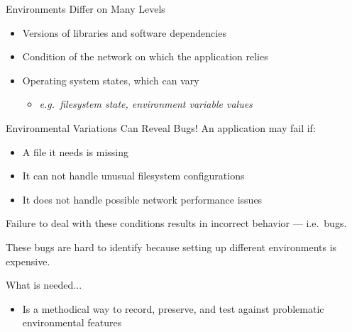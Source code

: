 \documentclass[pdf]{beamer}
\begin{document}
\begin{frame}{Environments Differ on Many Levels}
  \begin{itemize}
  \item{Versions of libraries and software dependencies}
  \item{Condition of the network on which the application relies}
  \item{Operating system states, which can vary}
    \begin{itemize}
    \item{\textit{e.g.\ filesystem state, environment variable values}}
    \end{itemize}
  \end{itemize}
\end{frame}


\begin{frame}{Environmental Variations Can Reveal Bugs!}
  An application may fail if:
  \begin{itemize}
  \item{A file it needs is missing}
  \item{It can not handle unusual filesystem configurations}
  \item{It does not handle possible network performance issues}

      \end{itemize}
      Failure to deal with these conditions results in incorrect behavior --- i.e.\ bugs.

      These bugs are hard to identify because setting up different environments is
      expensive.
\end{frame}


\begin{frame}{What is needed...}
  \begin{itemize}
    \item{Is a methodical way to record, preserve, and test against
      problematic environmental features}
  \end{itemize}
\end{frame}


\end{document}
